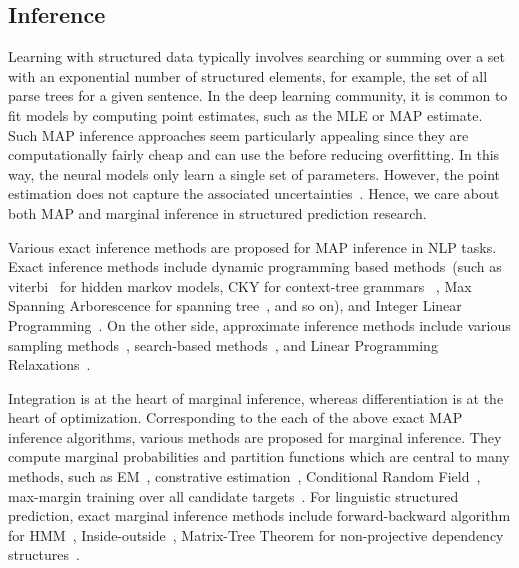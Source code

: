 \subsection{Inference}
\label{ssec:bg:inference}

Learning with structured data typically involves searching or summing
over a set with an exponential number of structured elements, for
example, the set of all parse trees for a given sentence. In the deep
learning community, it is common to fit models by computing point
estimates, such as the MLE or MAP estimate. Such MAP inference
approaches seem particularly appealing since they are computationally
fairly cheap and can use the before reducing overfitting. In this
way, the neural models only learn a single set of parameters. However,
the point estimation does not capture the associated
uncertainties~\citep{murphy2022probabilistic,wilson2020bayesian}.
Hence, we care about both MAP
and marginal inference in structured prediction research.

 Various exact inference methods are proposed
for MAP inference in NLP tasks. Exact inference methods include
dynamic programming based methods~(such as
viterbi~\citep{viterbi1967error} for hidden markov models, CKY for
context-tree
grammars~\citep{kasami1966efficient,younger1967recognition,cocke1969programming}
, Max Spanning Arborescence for spanning
tree~\citep{chu1965shortest,edmonds1967optimum}, and so on), and
Integer Linear
Programming~\citep{roth2005integer,roth2007global,berant2014modeling}. On the other side, approximate inference methods include various
sampling methods~\citep{finkel2005incorporating,singh2012monte},
search-based
methods~\citep{daume2009search,ross2011reduction,chang2015learning},
and Linear Programming
Relaxations~\citep{rush2012tutorial,werner2014power}.

 Integration is at the heart of marginal
inference, whereas differentiation is at the heart of
optimization. Corresponding to the each of the above exact MAP
inference algorithms, various methods are proposed for marginal
inference. They compute marginal probabilities and partition functions
which are central to many methods, such as
EM~\citep{baker1979trainable,weizenbaum1966eliza}, constrative
estimation~\citep{smith2005contrastive}, Conditional Random
Field~\citep[CRF,][]{lafferty01crf}, max-margin training over all
candidate targets~\citep{koller2004max}. For linguistic structured
prediction, exact marginal inference methods include forward-backward
algorithm for HMM~\citep{binder1997space},
Inside-outside~\citep{baker1979trainable}, Matrix-Tree Theorem for
non-projective dependency
structures~\citep{koo-etal-2007-structured,liu2018learning}.

